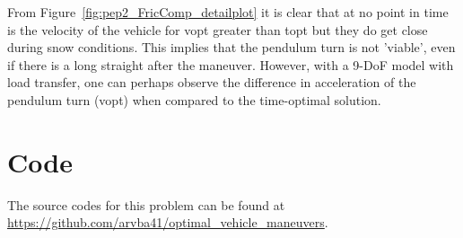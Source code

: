 From Figure~\ref{fig:pep2_FricComp_detailplot} it is clear that at no point in time is the velocity of the vehicle for vopt greater than topt but they do get close during snow conditions. This implies that the pendulum turn is not 'viable', even if there is a long straight after the maneuver. However, with a 9-DoF model with load transfer, one can perhaps observe the difference in acceleration of the pendulum turn (vopt) when compared to the time-optimal solution. 

\section*{Code}

The source codes for this problem can be found at \newline \href{https://github.com/arvba41/optimal_vehicle_maneuvers/blob/main/uppgift/pep1}{https://github.com/arvba41/optimal\_vehicle\_maneuvers}.

